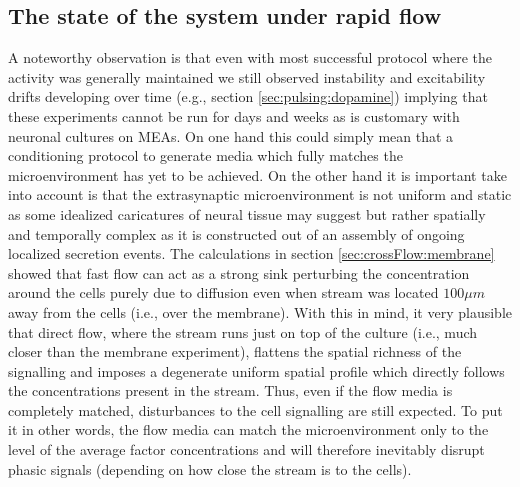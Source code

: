 \subsection{The state of the system under rapid flow}
A noteworthy observation is that even with most successful protocol where the activity was generally maintained we still observed instability and excitability drifts developing over time (e.g., section \ref{sec:pulsing:dopamine}) implying that these experiments cannot be run for days and weeks as is customary with neuronal cultures on MEAs. On one hand this could simply mean that a conditioning protocol to generate media which fully matches the microenvironment has yet to be achieved. On the other hand it is important take into account is that the extrasynaptic microenvironment is not uniform and static as some idealized caricatures of neural tissue may suggest but rather spatially and temporally complex as it is constructed out of an assembly of ongoing localized secretion events. The calculations in section \ref{sec:crossFlow:membrane} showed that fast flow can act as a strong sink perturbing the concentration around the cells purely due to diffusion even when stream was located \(100\mu m\) away from the cells (i.e., over the membrane). With this in mind, it very plausible that direct flow, where the stream runs just on top of the culture (i.e., much closer than the membrane experiment), flattens the spatial richness of the signalling and imposes a degenerate uniform spatial profile which directly follows the concentrations present in the stream. Thus, even if the flow media is completely matched, disturbances to the cell signalling are still expected. To put it in other words, the flow media can match the microenvironment only to the level of the average factor concentrations and will therefore inevitably disrupt phasic signals (depending on how close the stream is to the cells).

